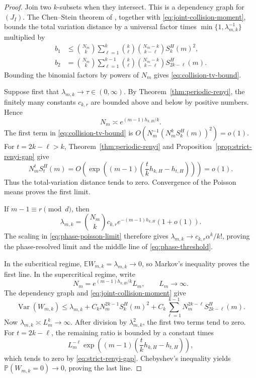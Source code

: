 \begin{proof}
Join two \(k\)-subsets when they intersect.  This is a dependency graph
for \((J_I)\).  The Chen--Stein theorem of
\citet[Theorem~1]{ArratiaGoldsteinGordon1989}, together with
\eqref{eq:joint-collision-moment}, bounds the total variation distance
by a universal factor times \(\min\{1,\lambda_{m,k}^{-1}\}\) multiplied
by
\begin{align*}
 b_1
 &\leq \binom{N_m}{k}
   \sum_{\ell=1}^k
   \binom{k}{\ell}\binom{N_m-k}{k-\ell}S_k^H(m)^2,\\
 b_2
 &=\binom{N_m}{k}
   \sum_{\ell=1}^{k-1}
   \binom{k}{\ell}\binom{N_m-k}{k-\ell}
   S_{2k-\ell}^H(m).
\end{align*}
Bounding the binomial factors by powers of \(N_m\) gives
\eqref{eq:collision-tv-bound}.

Suppose first that \(\lambda_{m,k}\to\tau\in(0,\infty)\).  By
Theorem~\ref{thm:periodic-renyi}, the finitely many constants
\(c_{k,r}\) are bounded above and below by positive numbers.  Hence
\[
  N_m\asymp e^{(m-1)h_{k,H}/k}.
\]
The first term in \eqref{eq:collision-tv-bound} is
\(O(N_m^{-1}(N_m^kS_k^H(m))^2)=o(1)\).  For
\(t=2k-\ell>k\), Theorem~\ref{thm:periodic-renyi} and
Proposition~\ref{prop:strict-renyi-gap} give
\[
  N_m^tS_t^H(m)
  =O\!\left(
    \exp\left((m-1)\left(\frac{t}{k}h_{k,H}-h_{t,H}\right)\right)
  \right)
  =o(1).
\]
Thus the total-variation distance tends to zero.  Convergence of the
Poisson means proves the first limit.

If \(m-1\equiv r\pmod d\), then
\[
  \lambda_{m,k}
  =\binom{N_m}{k}c_{k,r}e^{-(m-1)h_{k,H}}(1+o(1)).
\]
The scaling in \eqref{eq:phase-poisson-limit} therefore gives
\(\lambda_{m,k}\to c_{k,r}\alpha^k/k!\), proving the phase-resolved
limit and the middle line of \eqref{eq:phase-threshold}.

In the subcritical regime, \(\mathbb EW_{m,k}=\lambda_{m,k}\to0\), so
Markov's inequality proves the first line.  In the supercritical regime,
write
\[
  N_m=e^{(m-1)h_{k,H}/k}L_m,
  \qquad L_m\longrightarrow\infty.
\]
The dependency graph and \eqref{eq:joint-collision-moment} give
\[
  \operatorname{Var}(W_{m,k})
  \leq\lambda_{m,k}
  +C_kN_m^{2k-1}S_k^H(m)^2
  +C_k\sum_{\ell=1}^{k-1}
      N_m^{2k-\ell}S_{2k-\ell}^H(m).
\]
Now \(\lambda_{m,k}\asymp L_m^k\to\infty\).  After division by
\(\lambda_{m,k}^2\), the first two terms tend to zero.  For
\(t=2k-\ell\), the remaining ratio is bounded by a constant times
\[
  L_m^{-\ell}
  \exp\left((m-1)\left(\frac{t}{k}h_{k,H}-h_{t,H}\right)\right),
\]
which tends to zero by \eqref{eq:strict-renyi-gap}.  Chebyshev's
inequality yields \(\mathbb P(W_{m,k}=0)\to0\), proving the last line.
\end{proof}

